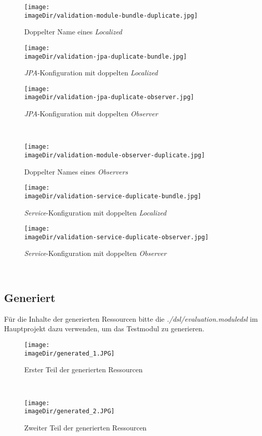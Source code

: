 \begin{figure}[h]
	\centering
	\texttt{[image: \\imageDir/validation-module-bundle-duplicate.jpg]}
	\caption{Doppelter Name eines \emph{Localized}}
	\label{fig:validation-7}
\end{figure}

\begin{figure}[h]
	\centering
	\texttt{[image: \\imageDir/validation-jpa-duplicate-bundle.jpg]}
	\caption{\emph{JPA}-Konfiguration mit doppelten \emph{Localized}}
	\label{fig:validation-7}
\end{figure}

\begin{figure}[h]
	\centering
	\texttt{[image: \\imageDir/validation-jpa-duplicate-observer.jpg]}
	\caption{\emph{JPA}-Konfiguration mit doppelten \emph{Observer}}
	\label{fig:validation-8}
\end{figure}
\ \newpage


\begin{figure}[h]
	\centering
	\texttt{[image: \\imageDir/validation-module-observer-duplicate.jpg]}
	\caption{Doppelter Names eines \emph{Observers}}
	\label{fig:validation-9}
\end{figure}

\begin{figure}[h]
	\centering
	\texttt{[image: \\imageDir/validation-service-duplicate-bundle.jpg]}
	\caption{\emph{Service}-Konfiguration mit doppelten \emph{Localized}}
	\label{fig:validation-10}
\end{figure}
	
\begin{figure}[h]
	\centering
	\texttt{[image: \\imageDir/validation-service-duplicate-observer.jpg]}
	\caption{\emph{Service}-Konfiguration mit doppelten \emph{Observer}}
	\label{fig:validation-10}
\end{figure}
\ \newpage

\subsection{Generiert}
Für die Inhalte der generierten Ressourcen bitte die \emph{./dsl/evaluation.moduledsl} im Hauptprojekt dazu verwenden, um das Testmodul zu generieren.
\begin{figure}[h]
	\centering
	\texttt{[image: \\imageDir/generated\_1.JPG]}
	\caption{Erster Teil der generierten Ressourcen}
	\label{fig:generated-1}
\end{figure}
\ \newpage

\begin{figure}[h]
	\centering
	\texttt{[image: \\imageDir/generated\_2.JPG]}
	\caption{Zweiter Teil der generierten Ressourcen}
	\label{fig:generated-2}
\end{figure}
